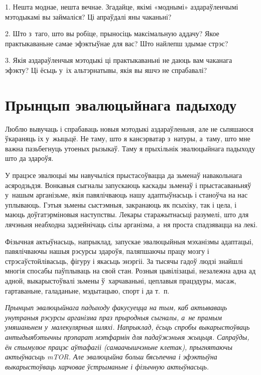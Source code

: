 1. Нешта моднае, нешта вечнае. Згадайце, якімі «моднымі» аздараўленчымі мэтодыкамі вы займаліся? Ці апраўдалі яны чаканьні?

2. Што з~таго, што вы робіце, прыносіць максімальную аддачу? Якое практыкаваньне самае эфэктыўнае для вас? Што найлепш здымае стрэс?

3. Якія аздараўленчыя мэтодыкі ці практыкаваньні не даюць вам чаканага эфэкту? Ці ёсьць у~іх альтэрнатывы, якія вы яшчэ не спрабавалі?


\section{Прынцып эвалюцыйнага падыходу}

Люблю вывучаць і спрабаваць новыя мэтодыкі аздараўленьня, але не сьпяшаюся ўкараняць іх у~жыцьцё. Не таму, што я кансэрватар з~натуры, а~таму, што мне важна пазьбегнуць утоеных рызыкаў. Таму я прыхільнік эвалюцыйнага падыходу што да здароўя.

У працэсе эвалюцыі мы навучыліся прыстасоўвацца да зьменаў навакольнага асяродзьдзя. Вонкавыя сыгналы запускаюць каскады зьменаў і прыстасаваньняў у~нашым арганізьме, якія павялічваюць нашу адаптыўнасьць і станоўча на нас уплываюць. Гэтыя зьмены сыстэмныя, закранаюць як псыхіку, так і цела, і маюць доўгатэрміновыя наступствы. Лекары старажытнасьці разумелі, што для лячэньня неабходна задзейнічаць сілы арганізма, а~ня проста спадзявацца на лекі. 


Фізычная актыўнасьць, напрыклад, запускае эвалюцыйныя мэханізмы адаптацыі, павялічваючы нашыя рэсурсы здароўя, паляпшаючы працу мозгу і стрэсаўстойлівасьць, фігуру і якасьць энэргіі. За тысячы гадоў людзі знайшлі многія спосабы паўплываць на свой стан. Розныя цывілізацыі, незалежна адна ад адной, выкарыстоўвалі зьмены ў~харчаваньні, цеплавыя працэдуры, масаж, гартаваньне, галаданьне, мэдытацыю, спорт і да т.~п.

\emph{Прынцып эвалюцыйнага падыходу факусуецца на тым, каб актываваць унутраныя рэсурсы арганізма праз прыродныя сыгналы, а~не прамым умяшаньнем у~малекулярныя шляхі. Напрыклад, ёсьць спробы выкарыстоўваць антыдыябэтычны прэпарат мэтфармін для падаўжэньня жыцьця. Сапраўды, ён стымулюе працэс аўтафагіі (самаачышчэньне клетак), прыгнятаючы актыўнасьць mTOR. Але эвалюцыйна больш бясьпечна і эфэктыўна выкарыстоўваць харчовае ўстрыманьне і фізычную актыўнасьць.}


